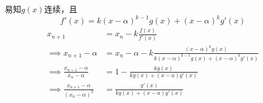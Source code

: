 \documentclass[a4paper]{article}
\begin{document}
易知$g(x)$连续，且\[
f'(x) = k(x-\alpha)^{k-1}g(x) + (x-\alpha)^kg'(x)
\]
\begin{align*}
  x_{n+1} &= x_n -k\frac{f(x)}{f'(x)}\\
  \implies x_{n+1} - \alpha&= x_n - \alpha -k\frac{(x - \alpha)^k g(x)}{k(x-\alpha)^{k-1}g(x) + (x-\alpha)^kg'(x)}\\
  \implies \frac{x_{n+1} - \alpha}{x_n - \alpha} &= 1 - \frac{kg(x)}{kg(x)+ (x-a)g'(x)}\\
  \implies \frac{x_{n+1} - \alpha}{(x_n - \alpha)^2} &= \frac{g'(x)}{kg(x)+ (x-a)g'(x)}
\end{align*}


\end{document}
